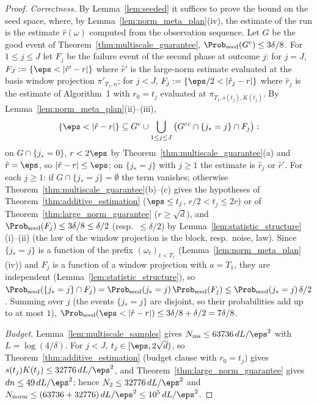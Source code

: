 \begin{proof}
\leanok
{}
\emph{Correctness.} By Lemma~\ref{lem:seeded} it suffices to prove the bound on the seed
space, where, by Lemma~\ref{lem:norm_meta_plan}(iv), the estimate of the run is the
estimate $\hat r(\omega)$ computed from the observation sequence. Let $G$ be the good event
of Theorem~\ref{thm:multiscale_guarantee}, $\Prob_{\mathrm{seed}}(G^c) \le 3\delta/8$. For
$1 \le j \le J$ let $F_j$ be the failure event of the second phase at outcome $j$: for
$j = J$, $F_J := \{ \eps < |\hat r' - r| \}$ where $\hat r'$ is the large-norm estimate
evaluated at the basis window projection $\pi'_{T_1,n}$; for $j < J$,
$F_j := \{ \eps/2 < |\hat r_j - r| \}$ where $\hat r_j$ is the estimate of Algorithm~1 with
$r_0 = t_j$ evaluated at $\pi_{T_1, s(t_j), K(t_j)}$. By Lemma~\ref{lem:norm_meta_plan}(ii)--(iii),
\[
  \{ \eps < |\hat r - r| \} \subseteq G^c \cup \bigcup_{1 \le j \le J}
    \big( G^c{}^c \cap \{j_* = j\} \cap F_j \big):
\]
on $G \cap \{j_* = 0\}$, $r < 2\eps$ by Theorem~\ref{thm:multiscale_guarantee}(a) and
$\hat r = \eps$, so $|\hat r - r| \le \eps$; on $\{j_* = j\}$ with $j \ge 1$ the estimate is
$\hat r_j$ or $\hat r'$. For each $j \ge 1$: if $G \cap \{j_* = j\} = \emptyset$ the term
vanishes; otherwise Theorem~\ref{thm:multiscale_guarantee}(b)--(c) gives the hypotheses of
Theorem~\ref{thm:additive_estimation} ($\eps \le t_j$, $r/2 < t_j \le 2r$) or of
Theorem~\ref{thm:large_norm_guarantee} ($r \ge \sqrt d$), and
$\Prob_{\mathrm{seed}}(F_j) \le 3\delta/8 \le \delta/2$ (resp.\ $\le \delta/2$) by
Lemma~\ref{lem:statistic_structure}(i)--(ii) (the law of the window projection is the
block, resp.\ noise, law). Since $\{j_* = j\}$ is a function of the prefix
$(\omega_t)_{t<T_1}$ (Lemma~\ref{lem:norm_meta_plan}(iv)) and $F_j$ is a function of a window
projection with $a = T_1$, they are independent (Lemma~\ref{lem:statistic_structure}), so
$\Prob_{\mathrm{seed}}(\{j_* = j\} \cap F_j) = \Prob_{\mathrm{seed}}(j_* = j)\,\Prob_{\mathrm{seed}}(F_j)
\le \Prob_{\mathrm{seed}}(j_* = j)\,\delta/2$. Summing over $j$ (the events $\{j_* = j\}$ are
disjoint, so their probabilities add up to at most $1$),
$\Prob_{\mathrm{seed}}(\eps < |\hat r - r|) \le 3\delta/8 + \delta/2 = 7\delta/8$.

\emph{Budget.} Lemma~\ref{lem:multiscale_samples} gives $N_{\mathrm{ms}} \le 63736\,dL/\eps^2$
with $L = \log(4/\delta)$. For $j < J$, $t_j \in [\eps, 2\sqrt d)$, so
Theorem~\ref{thm:additive_estimation} (budget clause with $r_0 = t_j$) gives
$s(t_j)K(t_j) \le 32776\,dL/\eps^2$, and Theorem~\ref{thm:large_norm_guarantee} gives
$dn \le 49\,dL/\eps^2$; hence $N_2 \le 32776\,dL/\eps^2$ and
$N_{\mathrm{norm}} \le (63736 + 32776)\,dL/\eps^2 \le 10^5\,dL/\eps^2$.
\end{proof}


